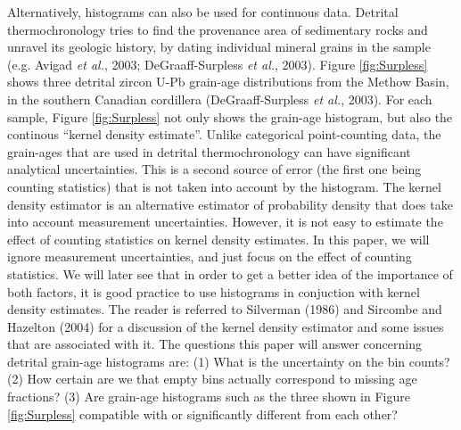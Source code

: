 \documentclass{article}
\begin{document}
Alternatively,  histograms  can  also  be used  for  continuous  data.
Detrital  thermochronology  tries  to  find  the  provenance  area  of
sedimentary  rocks  and  unravel   its  geologic  history,  by  dating
individual mineral  grains in the  sample (e.g.  Avigad {\it  et al.},
2003;    DeGraaff-Surpless    {\it    et    al.},    2003).     Figure
\ref{fig:Surpless}   shows  three   detrital  zircon   U-Pb  grain-age
distributions  from  the  Methow   Basin,  in  the  southern  Canadian
cordillera (DeGraaff-Surpless  {\it et al.}, 2003).   For each sample,
Figure \ref{fig:Surpless} not only  shows the grain-age histogram, but
also  the continous ``kernel  density estimate''.   Unlike categorical
point-counting  data,  the  grain-ages   that  are  used  in  detrital
thermochronology can have  significant analytical uncertainties.  This
is a second source of  error (the first one being counting statistics)
that is not  taken into account by the  histogram.  The kernel density
estimator is an alternative estimator of probability density that does
take into account measurement  uncertainties.  However, it is not easy
to  estimate  the effect  of  counting  statistics  on kernel  density
estimates.  In  this paper, we will  ignore measurement uncertainties,
and just focus on the effect of counting statistics. We will later see
that in order to get a  better idea of the importance of both factors,
it  is good  practice  to  use histograms  in  conjuction with  kernel
density  estimates.  The reader  is referred  to Silverman  (1986) and
Sircombe and  Hazelton (2004) for  a discussion of the  kernel density
estimator and some issues that  are associated with it.  The questions
this paper  will answer concerning detrital  grain-age histograms are:
(1) What is the uncertainty on the  bin counts? (2) How certain are we
that empty bins actually correspond to missing age fractions?  (3) Are
grain-age   histograms   such   as   the   three   shown   in   Figure
\ref{fig:Surpless}  compatible with  or  significantly different  from
each other?\\
\end{document}
